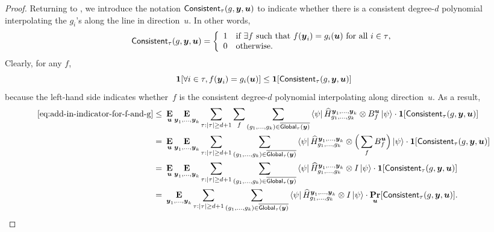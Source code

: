 \begin{proof}
Returning to ,
we introduce the  notation $\mathsf{Consistent}_{\tau}(g, \boldsymbol{y}, \boldsymbol{u})$
to indicate whether there is a consistent degree-$d$ polynomial
interpolating the $g_i$'s along the line in direction~$u$.
In other words,
\begin{equation*}
\mathsf{Consistent}_{\tau}(g, \boldsymbol{y}, \boldsymbol{u})
= \left\{\begin{array}{rl}
	1 & \text{if $\exists f$ such that $f(\boldsymbol{y}_i) = g_i(\boldsymbol{u})$ for all $i \in \tau$,}\\
	0 & \text{otherwise.}
	\end{array}\right.
\end{equation*}
Clearly, for any $f$,
\begin{equation*}
\boldsymbol{1}[\forall i\in \tau, f(\boldsymbol{y}_i) = g_i(\boldsymbol{u})] \leq \boldsymbol{1}[\mathsf{Consistent}_{\tau}(g, \boldsymbol{y}, \boldsymbol{u})]
\end{equation*}
because the left-hand side indicates whether~$f$ is the consistent degree-$d$ polynomial
interpolating along direction~$u$.
As a result,
\begin{align}
\eqref{eq:add-in-indicator-for-f-and-g}
\leq~&
\mathop{\bf E\/}_{\boldsymbol{u}} \mathop{\bf E\/}_{\boldsymbol{y}_1, \ldots, \boldsymbol{y}_k} \sum_{\tau:|\tau|\geq d+1} \sum_f  \sum_{(g_1, \ldots, g_k) \in \overline{\mathsf{Global}_{\tau}(\boldsymbol{y})}} \bra{\psi} \widehat{H}^{\boldsymbol{y}_1, \ldots, \boldsymbol{y}_k}_{g_1, \ldots, g_k} \otimes B^{\boldsymbol{u}}_f \ket{\psi} \cdot \boldsymbol{1}[\mathsf{Consistent}_{\tau}(g,\boldsymbol{y},\boldsymbol{u})]\nonumber\\
=~&
\mathop{\bf E\/}_{\boldsymbol{u}} \mathop{\bf E\/}_{\boldsymbol{y}_1, \ldots, \boldsymbol{y}_k} \sum_{\tau:|\tau|\geq d+1} \sum_{(g_1, \ldots, g_k) \in \overline{\mathsf{Global}_{\tau}(\boldsymbol{y})}} \bra{\psi} \widehat{H}^{\boldsymbol{y}_1, \ldots, \boldsymbol{y}_k}_{g_1, \ldots, g_k} \otimes \Big(\sum_f B^{\boldsymbol{u}}_f\Big) \ket{\psi} \cdot \boldsymbol{1}[\mathsf{Consistent}_{\tau}(g,\boldsymbol{y},\boldsymbol{u})]\nonumber\\
=~&
\mathop{\bf E\/}_{\boldsymbol{u}} \mathop{\bf E\/}_{\boldsymbol{y}_1, \ldots, \boldsymbol{y}_k}   \sum_{\tau:|\tau|\geq d+1} \sum_{(g_1, \ldots, g_k)  \in \overline{\mathsf{Global}_{\tau}(\boldsymbol{y})}} \bra{\psi} \widehat{H}^{\boldsymbol{y}_1, \ldots, \boldsymbol{y}_k}_{g_1, \ldots, g_k} \otimes I \ket{\psi} \cdot \boldsymbol{1}[\mathsf{Consistent}_{\tau}(g,\boldsymbol{y},\boldsymbol{u})]\nonumber\\
=~&
 \mathop{\bf E\/}_{\boldsymbol{y}_1, \ldots, \boldsymbol{y}_k}   \sum_{\tau:|\tau|\geq d+1} \sum_{(g_1, \ldots, g_k) \in \overline{\mathsf{Global}_{\tau}(\boldsymbol{y})}} \bra{\psi} \widehat{H}^{\boldsymbol{y}_1, \ldots, \boldsymbol{y}_k}_{g_1, \ldots, g_k} \otimes I \ket{\psi} \cdot \mathop{\bf Pr\/}_{\boldsymbol{u}}[\mathsf{Consistent}_{\tau}(g,\boldsymbol{y},\boldsymbol{u})].\label{eq:consistent-indicator}
\end{align}


\end{proof}
